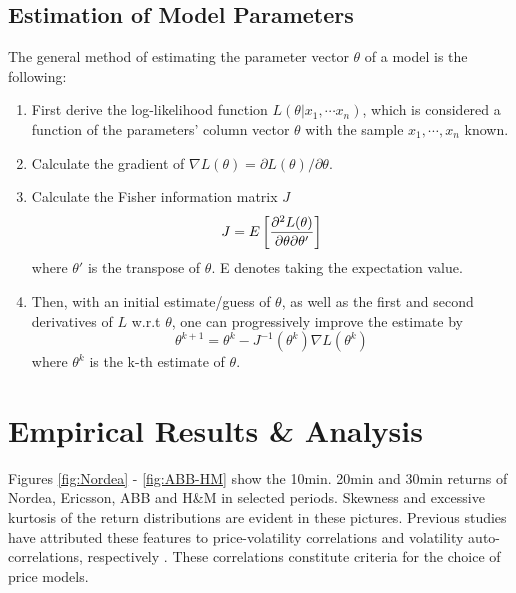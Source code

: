 \documentclass{book}
\begin{document}
\section{Estimation of Model Parameters}
The general method of estimating the parameter vector $\theta$ of a
model is the following:
\begin{enumerate}
\item First derive the log-likelihood function $L(\theta | x_1, \cdots
  x_n)$, which is considered a function of the parameters' column
  vector $\theta$ with the sample $x_1, \cdots, x_n$ known.

\item Calculate the gradient of $\nabla L(\theta) = \partial
  L(\theta) / \partial \theta$.
\item Calculate the Fisher information matrix $J$
  \[
  J = E \left[
    {\partial^2 L(\theta) \over \partial \theta \partial \theta'}
  \right]
  \]
  where $\theta'$ is the transpose of $\theta$. E denotes taking the
  expectation value.

\item Then, with an initial estimate/guess of $\theta$, as well as the
  first and second derivatives of $L$ w.r.t $\theta$, one can
  progressively improve the estimate by
  \[
  \theta^{k+1} = \theta^k - J^{-1} (\theta^k)\nabla L(\theta^k)
  \]
  where $\theta^k$ is the k-th estimate of $\theta$.
\end{enumerate}


\chapter{Empirical Results \& Analysis}
Figures \ref{fig:Nordea} - \ref{fig:ABB-HM} show the 10min. 20min and
30min returns of Nordea, Ericsson, ABB and H\&M in selected
periods. Skewness and excessive kurtosis of the return distributions are
evident in these pictures. Previous studies have attributed these
features to price-volatility correlations and volatility
auto-correlations, respectively \cite{FinancialRisk}. These
correlations constitute criteria for the choice of price models.
\end{document}
